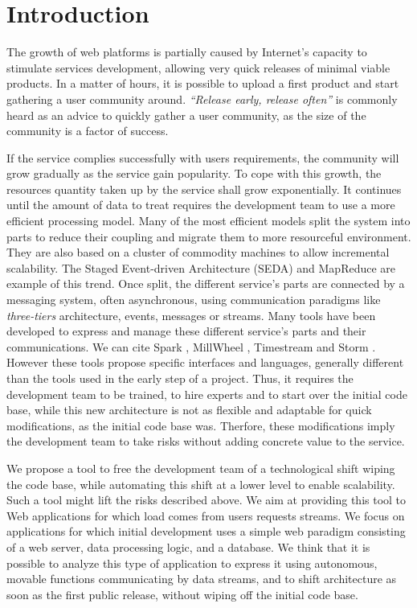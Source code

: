 \section{Introduction}


The growth of web platforms is partially caused by Internet's capacity to stimulate services development, allowing very quick releases of minimal viable products.
In a matter of hours, it is possible to upload a first product and start gathering a user community around.
\textit{``Release early, release often''} is commonly heard as an advice to quickly gather a user community, as the size of the community is a factor of success.

If the service complies successfully with users requirements, the community will grow gradually as the service gain popularity.
To cope with this growth, the resources quantity taken up by the service shall grow exponentially.
It continues until the amount of data to treat requires the development team to use a more efficient processing model.  %
Many of the most efficient models split the system into parts to reduce their coupling and migrate them to more resourceful environment.
They are also based on a cluster of commodity machines\cite{Fox1997} to allow incremental scalability.
The Staged Event-driven Architecture (SEDA)\cite{Welsh2000} and MapReduce \cite{Dean2008} are example of this trend.
Once split, the different service's parts are connected by a messaging system, often asynchronous, using communication paradigms like \textit{three-tiers} architecture, events, messages or streams.
Many tools have been developed to express and manage these different service's parts and their communications.
We can cite Spark \cite{Zaharia2010}, MillWheel \cite{Akidau2013}, Timestream \cite{Qian2013} and Storm \cite{Marz2011}.
However these tools propose specific interfaces and languages, generally different than the tools used in the early step of a project.
Thus, it requires the development team to be trained, to hire experts and to start over the initial code base, while this new architecture is not as flexible and adaptable for quick modifications, as the initial code base was.
Therfore, these modifications imply the development team to take risks without adding concrete value to the service.

We propose a tool to free the development team of a technological shift wiping the code base, while automating this shift at a lower level to enable scalability.
Such a tool might lift the risks described above.
We aim at providing this tool to Web applications for which load comes from users requests streams.
We focus on applications for which initial development uses a simple web paradigm consisting of a web server, data processing logic, and a database.
We think that it is possible to analyze this type of application to express it using autonomous, movable functions communicating by data streams, and to shift architecture as soon as the first public release, without wiping off the initial code base.

